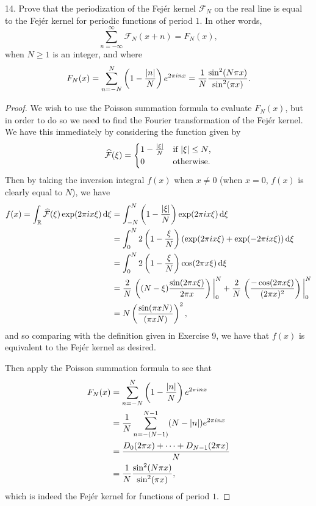 \documentclass[11pt]{article}
\newcommand{\br}[1]{\left(#1\right)}
\begin{document}
14. Prove that the periodization of the Fej\'er kernel $\mathcal{F}_N$ on the real line is equal to the Fej\'er kernel for periodic functions of period $1$. In other words, \[\sum_{n=-\infty}^{\infty}\mathcal{F}_N(x+n) = F_N(x),\] when $N\geq 1$ is an integer, and where \[F_N(x) = \sum_{n=-N}^N \br{1-\frac{\abs{n}}{N}}e^{2\pi i n x} = \frac{1}{N}\frac{\sin^2(N\pi x)}{\sin^2(\pi x)}.\]
\begin{proof}
    We wish to use the Poisson summation formula to evaluate $F_N(x)$, but in order to do so we need to find the Fourier transformation of the Fej\'er kernel. We have this immediately by considering the function given by \[\widehat{\mathcal{F}}(\xi) = \begin{cases}
        1-\frac{\abs{\xi}}{N} & \text{if $\abs{\xi}\leq N$,}\\
        0 & \text{otherwise.}
    \end{cases}\]
    Then by taking the inversion integral $f(x)$ when $x\neq 0$ (when $x= 0$, $f(x)$ is clearly equal to $N$), we have \begin{align*}
        f(x) = \int_\mathbb{R} \widehat{\mathcal{F}}(\xi)\exp(2\pi i x\xi)\dd{\xi} &= \int_{-N}^N \br{1-\frac{\abs{\xi}}{N}}\exp(2\pi i x\xi)\dd{\xi}\\
        &= \int_0^N 2\br{1-\frac{\xi}{N}}\br{\exp(2\pi i x\xi) + \exp(-2\pi i x\xi)}\dd{\xi}\\
        &= \int_0^N 2\br{1-\frac{\xi}{N}}\cos(2\pi x \xi)\dd{\xi}\\
        &= \frac{2}{N} \eval{\br{ (N-\xi)\frac{\sin(2\pi x \xi)}{2\pi x}}}_0^N + \frac{2}{N}\eval{\br{\frac{-\cos(2\pi x \xi)}{(2\pi x)^2}}}_0^N\\
        &= N\br{\frac{\sin(\pi x N)}{(\pi x N)}}^2,
    \end{align*} and so comparing with the definition given in Exercise 9, we have that $f(x)$ is equivalent to the Fej\'er kernel as desired.

    Then apply the Poisson summation formula to see that \begin{align*}
        F_N(x) &= \sum_{n=-N}^N \br{1-\frac{\abs{n}}{N}}e^{2\pi i n x} \\
        &= \frac{1}{N}\sum_{n=-(N-1)}^{N-1} (N-\abs{n})e^{2\pi i n x} \\
        &= \frac{D_0(2\pi x) + \cdots + D_{N-1}(2\pi x)}{N} \\
        &= \frac{1}{N}\frac{\sin^2(N\pi x)}{\sin^2(\pi x)},
    \end{align*}
    which is indeed the Fej\'er kernel for functions of period $1$.
\end{proof}
\end{document}
